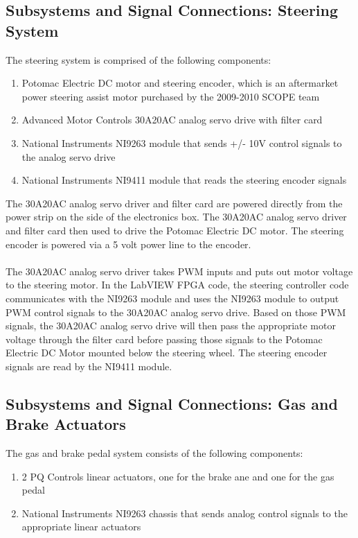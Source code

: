 \subsection{Subsystems and Signal Connections: Steering System}

The steering system is comprised of the following components:

\begin{enumerate}
\item Potomac Electric DC motor and steering encoder, which is an aftermarket power steering assist motor purchased by the 2009-2010 SCOPE team
\item Advanced Motor Controls 30A20AC analog servo drive with filter card
\item National Instruments NI9263 module that sends +/- 10V control signals to the analog servo drive
\item National Instruments NI9411 module that reads the steering encoder signals
\end{enumerate}

The 30A20AC analog servo driver and filter card are powered directly from the power strip on the side of the electronics box. The 30A20AC analog servo driver and filter card then used to drive the Potomac Electric DC motor. The steering encoder is powered via a 5 volt power line to the encoder.\\ \\
%
\noindent The 30A20AC analog servo driver takes PWM inputs and puts out motor voltage to the steering motor. In the LabVIEW FPGA code, the steering controller code communicates with the NI9263 module and uses the NI9263 module to output PWM control signals to the 30A20AC analog servo drive. Based on those PWM signals, the 30A20AC analog servo drive will then pass the appropriate motor voltage through the filter card before passing those signals to the Potomac Electric DC Motor mounted below the steering wheel. The steering encoder signals are read by the NI9411 module.

\subsection{Subsystems and Signal Connections: Gas and Brake Actuators}

The gas and brake pedal system consists of the following components:

\begin{enumerate}
\item 2 PQ Controls linear actuators, one for the brake ane and one for the gas pedal
\item National Instruments NI9263 chassis that sends analog control signals to the appropriate linear actuators
\end{enumerate}

